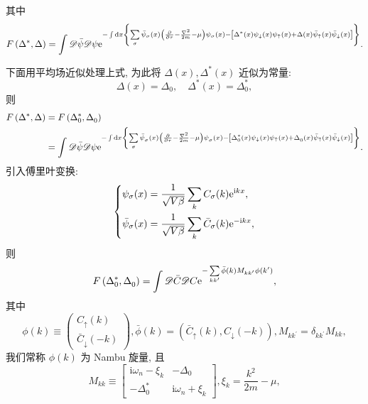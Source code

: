 其中
\begin{equation}
F\left(\Delta^{*}, \Delta\right)=\int\mathscr{D} \bar{\psi} \mathscr{D} \psi \mathrm{e}^{-\int \mathrm{d} x\left\{\sum\limits_{\sigma} \bar{\psi}_{\sigma}(x)\left(\frac{\partial}{\partial \tau}-\frac{\nabla^{2}}{2 m}-\mu\right) \psi_{\sigma}(x)-\left[\Delta^{*}( x)\psi_{\downarrow}(x) \psi_{\uparrow}(x)+\Delta(x) \bar{\psi}_{\uparrow}(x) \bar{\psi}_{\downarrow}(x)\right]\right\}}.
\end{equation}

下面用平均场近似处理上式, 为此将 $\Delta(x), \Delta^*(x)$ 近似为常量:
\begin{equation}
\Delta(x)=\Delta^{}_0, \quad \Delta^*(x)=\Delta^*_0,
\end{equation}
则
\begin{align}
F\left(\Delta^{*}, \Delta\right)&=F\left(\Delta_0^{*}, \Delta^{}_0\right)\nonumber\\
&=\int \mathscr{D} \bar{\psi} \mathscr{D} \psi \mathrm{e}^{-\int \mathrm{d} x\left\{\sum\limits_{\sigma} \bar{\psi}^{}_{\sigma}(x)\left(\frac{\partial}{\partial \tau}-\frac{\nabla^{2}}{2 m}-\mu\right) \psi^{}_{\sigma}(x)-\left[\Delta_0^{*}( x)\psi_{\downarrow}(x) \psi_{\uparrow}(x)+\Delta^{}_0(x) \bar{\psi}_{\uparrow}(x) \bar{\psi}_{\downarrow}(x)\right]\right\}}.
\end{align}
引入傅里叶变换:
\begin{equation}
\left\{\begin{aligned}
\psi_{\sigma}(x)&=\frac{1}{\sqrt{V\beta}} \sum_{k} C_{\sigma}(k) \mathrm{e}^{\mathrm{i} k x} ,\\
\bar{\psi}_{\sigma}(x)&=\frac{1}{\sqrt{V\beta}} \sum_{k} \bar{C}_{\sigma}(k) \mathrm{e}^{-\mathrm{i} k x},
\end{aligned}\right.
\end{equation}
则
\begin{equation}
 F\left(\Delta_{0}^{*}, \Delta^{}_{0}\right)=\int \mathscr{D} \bar{C} \mathscr{D} C \mathrm{e}^{-\sum\limits_{kk^\prime} \bar{\phi}(k) M_{kk^\prime} \phi({k^\prime})},
\end{equation}
其中
\begin{equation}
\phi(k)\equiv\left(\begin{array}{c}
C_{\uparrow}(k) \\
\bar{C}_{\downarrow}(-k)
\end{array}\right), \bar{\phi}{(k)}=\left(\bar{C}_{\uparrow}(k), {C}_{\downarrow}(-k)\right) ,M_{k k^{\prime}}=\delta_{k k^{\prime}} M_{k k},
\end{equation}
我们常称 $\phi(k)$ 为 Nambu 旋量, 且
\begin{equation}
M_{k k} \equiv\left[\begin{array}{cc}
\mathrm{i} \omega_{n}-\xi_{k} & -\Delta_{0} \\
-\Delta_{0}^{*} & \mathrm{i} \omega_{n}+\xi_{k}
\end{array}\right],
\xi_{k}=\frac{k^2}{2m}-\mu,
\end{equation}
